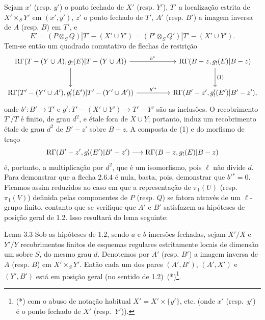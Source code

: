 Sejam $x'$ (resp. $y'$) o ponto fechado de $X'$ (resp. $Y'$), $T'$ a localização estrita de $X'\times_S Y'$ em $(x',y')$, $z'$ o ponto fechado de $T'$, $A'$ (resp. $B'$) a imagem inversa de $A$ (resp. $B$) em $T'$, e
\[
E'=(P\otimes_S Q)|T'-(X'\cup Y')
   =(P'\otimes_S Q')|T'-(X'\cup Y').
\]
Tem-se então um quadrado comutativo de flechas de restrição
\[
\begin{tikzcd}[column sep=huge,row sep=large]
\R\Gamma(T-(Y\cup A),g_!(E)|T-(Y\cup A))
 \arrow[r,"b^*"] \arrow[d]
&
\R\Gamma(B-z,g_!(E)|B-z) \arrow[d,"(1)"]\\
\R\Gamma(T'-(Y'\cup A'),g'_!(E')|T'-(Y'\cup A'))
 \arrow[r,"b'{}^*"]
&
\R\Gamma(B'-z',g'_!(E')|B'-z') ,
\end{tikzcd}
\]
onde $b':B'\to T'$ e $g':T'-(X'\cup Y')\to T'-Y'$ são as inclusões. O recobrimento $T'/T$ é finito, de grau $d^2$, e étale fora de $X\cup Y$; portanto, induz um recobrimento étale de grau $d^2$ de $B'-z'$ sobre $B-z$. A composta de (1) e do morfismo de traço
\[
\mathrm{R}\Gamma(B'-z',g'_!(E')|B'-z')
 \longrightarrow
\mathrm{R}\Gamma(B-z,g_!(E)|B-z)
\]
é, portanto, a multiplicação por $d^2$, que é um isomorfismo, pois $\ell$ não divide $d$. Para demonstrar que a flecha 2.6.4 é nula, basta, pois, demonstrar que $b'{}^*=0$. Ficamos assim reduzidos ao caso em que a representação de $\pi_1(U)$ (resp. $\pi_1(V)$) definida pelas componentes de $P$ (resp. $Q$) se fatora através de um $\ell$-grupo finito, contanto que se verifique que $A'$ e $B'$ satisfazem as hipóteses de posição geral de 1.2. Isso resultará do lema seguinte:

\begin{statement}{Lema 3.3}
Sob as hipóteses de 1.2, sendo $a$ e $b$ imersões fechadas, sejam $X'/X$ e $Y'/Y$ recobrimentos finitos de esquemas regulares estritamente locais de dimensão um sobre $S$, do mesmo grau $d$. Denotemos por $A'$ (resp. $B'$) a imagem inversa de $A$ (resp. $B$) em $X'\times_S Y'$. Então cada um dos pares $(A',B')$, $(A',X')$ e $(Y',B')$ está em posição geral (no sentido de 1.2)~(*)\footnote{(*) com o abuso de notação habitual $X'=X'\times\{y'\}$, etc. (onde $x'$ (resp.\ $y'$) é o ponto fechado de $X'$ (resp.\ $Y'$)).}.
\end{statement}
